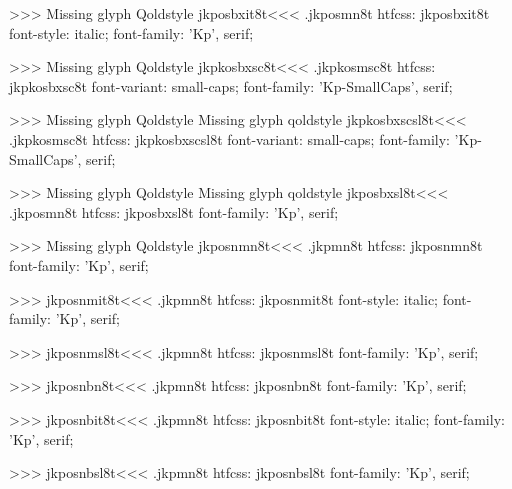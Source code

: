 >>>
Missing glyph	Qoldstyle
\<jkposbxit8t\><<<
.jkposmn8t
htfcss:  jkposbxit8t  font-style: italic; font-family: 'Kp', serif;

>>>
Missing glyph	Qoldstyle
\<jkpkosbxsc8t\><<<
.jkpkosmsc8t
htfcss:  jkpkosbxsc8t  font-variant: small-caps; font-family: 'Kp-SmallCaps', serif;

>>>
Missing glyph	Qoldstyle
Missing glyph	qoldstyle
\<jkpkosbxscsl8t\><<<
.jkpkosmsc8t
htfcss:  jkpkosbxscsl8t  font-variant: small-caps; font-family: 'Kp-SmallCaps', serif;

>>>
Missing glyph	Qoldstyle
Missing glyph	qoldstyle
\<jkposbxsl8t\><<<
.jkposmn8t
htfcss:  jkposbxsl8t  font-family: 'Kp', serif;

>>>
Missing glyph	Qoldstyle
\<jkposnmn8t\><<<
.jkpmn8t
htfcss:  jkposnmn8t  font-family: 'Kp', serif;

>>>
\<jkposnmit8t\><<<
.jkpmn8t
htfcss:  jkposnmit8t  font-style: italic; font-family: 'Kp', serif;

>>>
\<jkposnmsl8t\><<<
.jkpmn8t
htfcss:  jkposnmsl8t  font-family: 'Kp', serif;

>>>
\<jkposnbn8t\><<<
.jkpmn8t
htfcss:  jkposnbn8t  font-family: 'Kp', serif;

>>>
\<jkposnbit8t\><<<
.jkpmn8t
htfcss:  jkposnbit8t  font-style: italic; font-family: 'Kp', serif;

>>>
\<jkposnbsl8t\><<<
.jkpmn8t
htfcss:  jkposnbsl8t  font-family: 'Kp', serif;

